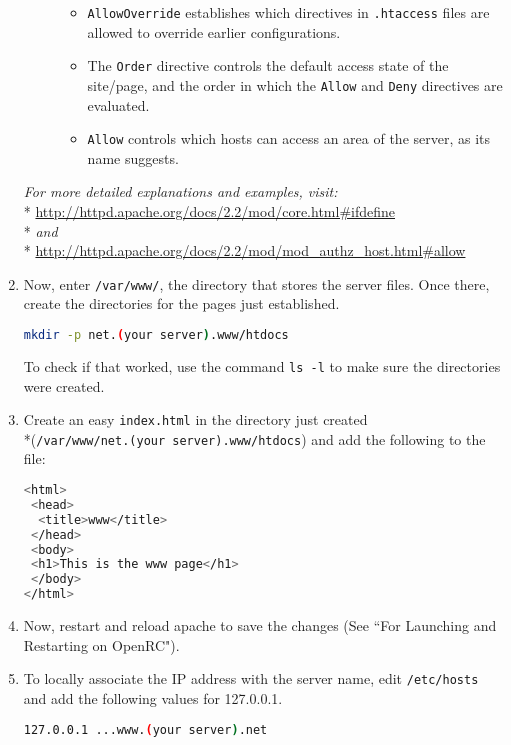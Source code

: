 \documentclass[11pt]{article}
\begin{document}
\begin{enumerate}
\begin{description}
\begin{itemize}
        \item \verb|AllowOverride| establishes which directives in \verb|.htaccess| files are allowed to override earlier configurations.
        \item The \verb|Order| directive controls the default access state of the site/page, and the order in which the \verb|Allow| and \verb|Deny| directives are evaluated.
        \item \verb|Allow| controls which hosts can access an area of the server, as its name suggests.
      \end{itemize}
    \end{description}
    \textit{For more detailed explanations and examples, visit:} 
    \\* \url{http://httpd.apache.org/docs/2.2/mod/core.html#ifdefine}
    \\* \emph{and}
    \\* \url{http://httpd.apache.org/docs/2.2/mod/mod_authz_host.html#allow}
    
  \item Now, enter \verb|/var/www/|, the directory that stores the server files. Once there, create the directories for the pages just established.
  \begin{lstlisting}[basicstyle=\ttfamily, backgroundcolor = \color{lightgray}, language = bash, xleftmargin = 0cm, framexleftmargin = 1em] 
mkdir -p net.(your server).www/htdocs
\end{lstlisting}
  To check if that worked, use the command 
  \verb|ls -l| to make sure the directories were created.
    
  \item Create an easy \verb|index.html| in the directory just created \\*(\verb|/var/www/net.(your server).www/htdocs|) and add the following to the file:
  \begin{lstlisting}[basicstyle=\ttfamily, backgroundcolor = \color{lightgray}, language = bash, xleftmargin = 0cm, framexleftmargin = 1em, framexrightmargin = 6em, showstringspaces=false] 
<html>
 <head> 
  <title>www</title>
 </head>
 <body>
 <h1>This is the www page</h1>
 </body>
</html>
\end{lstlisting}

  \item Now, restart and reload apache to save the changes (See ``For Launching and Restarting on OpenRC").
  
  \item To locally associate the IP address with the server name, edit \verb|/etc/hosts| and add the following values for 127.0.0.1.
  \begin{lstlisting}[basicstyle=\ttfamily, backgroundcolor = \color{lightgray}, language = bash, xleftmargin = 0cm, framexleftmargin = 1em, framexrightmargin = 6em, showstringspaces=false] 
127.0.0.1 ...www.(your server).net
\end{lstlisting}


\end{enumerate}
\end{document}
